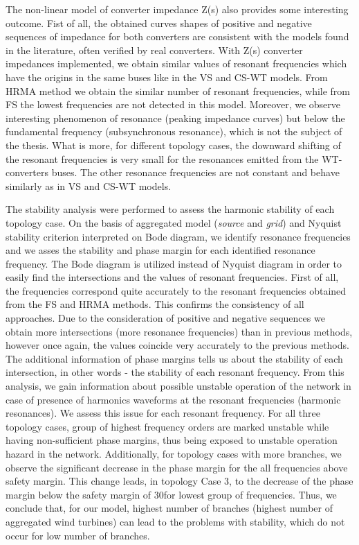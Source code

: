 \documentclass[a4paper,11pt,twoside,openright]{report}
\begin{document}
The non-linear model of converter impedance Z(s) also provides some interesting outcome. Fist of all, the obtained curves shapes of positive and negative sequences of impedance for both converters are consistent with the models found in the literature, often verified by real converters. With Z(s) converter impedances implemented, we obtain similar values of resonant frequencies which have the origins in the same buses like in the VS and CS-WT models. From HRMA method we obtain the similar number of resonant frequencies, while from FS the lowest frequencies are not detected in this model. Moreover, we observe interesting phenomenon of resonance (peaking impedance curves) but below the fundamental frequency (subsynchronous resonance), which is not the subject of the thesis. What is more, for different topology cases, the downward shifting of the resonant frequencies is very small for the resonances emitted from the WT-converters buses. The other resonance frequencies are not constant and behave similarly as in VS and CS-WT models.

The stability analysis were performed to assess the harmonic stability of each topology case. On the basis of aggregated model (\textit{source} and \textit{grid}) and Nyquist stability criterion interpreted on Bode diagram, we identify resonance frequencies and we asses the stability and phase margin for each identified resonance frequency. The Bode diagram is utilized instead of Nyquist diagram in order to easily find the intersections and the values of resonant frequencies. First of all, the frequencies correspond quite accurately to the resonant frequencies obtained from the FS and HRMA methods. This confirms the consistency of all approaches. Due to the consideration of positive and negative sequences we obtain more intersections (more resonance frequencies) than in previous methods, however once again, the values coincide very accurately to the previous methods. The additional information of phase margins tells us about the stability of each intersection, in other words - the stability of each resonant frequency. From this analysis, we gain information about possible unstable operation of the network in case of presence of harmonics waveforms at the resonant frequencies (harmonic resonances). We assess this issue for each resonant frequency. For all three topology cases, group of highest frequency orders are marked unstable while having non-sufficient phase margins, thus being exposed to unstable operation hazard in the network. Additionally, for topology cases with more branches, we observe the significant decrease in the phase margin for the all frequencies above safety margin. This change leads, in topology Case 3, to the decrease of the phase margin below the safety margin of 30\degree for lowest group of frequencies. Thus, we conclude that, for our model, highest number of branches (highest number of aggregated wind turbines) can lead to the problems with stability, which do not occur for low number of branches.
\end{document}
